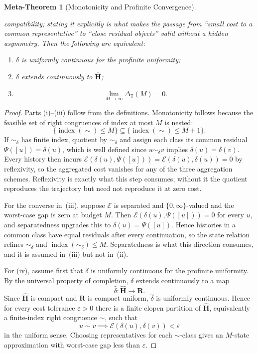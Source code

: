 \documentclass[12pt]{article}
\newtheorem{metatheorem}[theorem]{Meta-Theorem}
\theoremstyle{definition}
\begin{document}
\begin{metatheorem}[Monotonicity and Profinite Convergence]
\begin{enumerate}[label=(\roman*)]
compatibility; stating it explicitly is what makes the passage from ``small
cost to a common representative'' to ``close residual objects'' valid without
a hidden asymmetry.  Then the following are equivalent:
\begin{enumerate}[label=(\alph*)]
\item $\delta$ is uniformly continuous for the profinite uniformity;
\item $\delta$ extends continuously to $\widehat{\mathbf H}$;
\item
\[
\lim_{M\to\infty}\Delta_{\mathbb T}(M)=0.
\]
\end{enumerate}
\end{enumerate}
\end{metatheorem}

\begin{proof}
Parts (i)--(iii) follow from the definitions.  Monotonicity follows because
the feasible set of right congruences of index at most $M$ is nested:
\[
\{\operatorname{index}(\sim)\le M\}
\subseteq
\{\operatorname{index}(\sim)\le M+1\}.
\]
If $\sim_\delta$ has finite index, quotient by $\sim_\delta$ and assign each
class its common residual $\Psi([u])=\delta(u)$, which is well defined since
$u\sim_\delta v$ implies $\delta(u)=\delta(v)$.  Every history then incurs
$\mathcal E(\delta(u),\Psi([u]))=\mathcal E(\delta(u),\delta(u))=0$ by
reflexivity, so the aggregated cost vanishes for any of the three aggregation
schemes.  Reflexivity is exactly what this step consumes; without it the
quotient reproduces the trajectory but need not reproduce it at zero cost.

For the converse in~(iii), suppose $\mathcal E$ is separated and
$\{0,\infty\}$-valued and the worst-case gap is zero at budget $M$.  Then
$\mathcal E(\delta(u),\Psi([u]))=0$ for every $u$, and separatedness upgrades
this to $\delta(u)=\Psi([u])$.  Hence histories in a common class have equal
residuals after every continuation, so the state relation refines
$\sim_\delta$ and $\operatorname{index}(\sim_\delta)\le M$.  Separatedness is
what this direction consumes, and it is assumed in~(iii) but not in~(ii).

For (iv), assume first that $\delta$ is uniformly continuous for the profinite
uniformity.  By the universal property of completion, $\delta$ extends
continuously to a map
\[
\widehat\delta:\widehat{\mathbf H}\to\mathbf R.
\]
Since $\widehat{\mathbf H}$ is compact and $\mathbf R$ is compact uniform,
$\widehat\delta$ is uniformly continuous.  Hence for every cost tolerance
$\varepsilon>0$ there is a finite clopen partition of $\widehat{\mathbf H}$,
equivalently a finite-index right congruence $\sim$, such that
\[
u\sim v
\implies
\mathcal E(\delta(u),\delta(v))<\varepsilon
\]
in the uniform sense.  Choosing representatives for each $\sim$-class gives an
$M$-state approximation with worst-case gap less than $\varepsilon$.


\end{proof}
\end{document}
